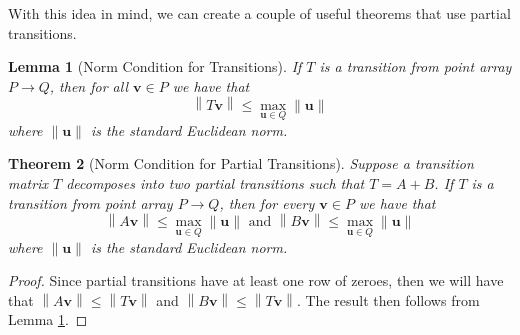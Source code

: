 \documentclass[a4paper,10pt]{article}
\theoremstyle{plain}
\newtheorem{Theorem}{Theorem}
\newtheorem{Lemma}[Theorem]{Lemma}
\theoremstyle{definition}
\theoremstyle{remark}
\renewcommand{\vec}[1]{\mathbf{#1}}
\newcommand\norm[1]{\left\lVert#1\right\rVert}
\begin{document}
With this idea in mind, we can create a couple of useful theorems that use partial transitions.
\begin{Lemma}[Norm Condition for Transitions]
	If \( T \) is a transition from point array \( P \to Q \), then for all \( \vec{v} \in P \) we have that
	\[\norm{T\vec{v}} \leq \max_{\vec{u} \in Q}\norm{\vec{u}}\]
	where \( \norm{\vec{u}} \) is the standard Euclidean norm.
	\label{thrm:norm-condition-for-transitions}
\end{Lemma}
\begin{Theorem}[Norm Condition for Partial Transitions]
	Suppose a transition matrix \( T \) decomposes into two partial transitions such that \( T = A + B \).
	If \( T \) is a transition from point array \( P \to Q \), then for every \( \vec{v} \in P \) we have that
	\[\norm{A\vec{v}} \leq \max_{\vec{u} \in Q}\norm{\vec{u}} \text{ and } \norm{B\vec{v}} \leq \max_{\vec{u} \in Q}\norm{\vec{u}}\]
	where \( \norm{\vec{u}} \) is the standard Euclidean norm.
	\label{thrm:norm-condition-for-partial-transitions}
\end{Theorem}
\begin{proof}
	Since partial transitions have at least one row of zeroes, then we will have that \( \norm{A\vec{v}} \leq \norm{T\vec{v}} \) and \( \norm{B\vec{v}} \leq \norm{T\vec{v}} \).
	The result then follows from Lemma \ref{thrm:norm-condition-for-transitions}.
\end{proof}
\end{document}
